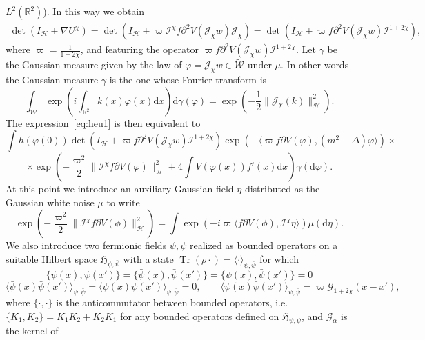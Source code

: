 \documentclass[a4paper,10pt]{article}
\newcommand{\comma}{{,}}
\newcommand{\mathd}{\mathrm{d}}
\newcommand{\tmop}[1]{\ensuremath{\operatorname{#1}}}
\begin{document}
$L^2 (\mathbb{R}^2)$). In this way we obtain
\begin{multline*}
  \det (I_{\mathcal{H}} + \nabla U^{\chi}) = \det (I_{\mathcal{H}} + \varpi
  \mathcal{I}^{\chi} f \partial^2 V (\mathcal{J}_{\chi} w) \mathcal{J}_{\chi})
  = \det (I_{\mathcal{H}} + \varpi f \partial^2 V (\mathcal{J}_{\chi} w)
  \mathcal{I}^{1 + 2 \chi}),
\end{multline*}
where $\varpi = \frac{1}{1 + 2 \chi}$, and featuring the operator $\varpi f
\partial^2 V (\mathcal{J}_{\chi} w) \mathcal{I}^{1 + 2 \chi}$. Let $\gamma$ be
the Gaussian measure given by the law of $\varphi =\mathcal{J}_{\chi} w \in
\widetilde{\mathcal{W}}$ under $\mu$. In other words the Gaussian measure
$\gamma$ is the one whose Fourier transform is
\[ \int_{\widetilde{\mathcal{W}}} \exp \left( i \int_{\mathbb{R}^2} k (x) \varphi (x) \mathd
   x \right) \mathd \gamma (\varphi) = \exp \left( - \frac{1}{2} \|
   \mathcal{J}_{\chi} (k) \|_{\mathcal{H}}^2 \right) . \]
The expression~{\eqref{eq:heu1}} is then equivalent to
\[ \int h (\varphi (0)) \det (I_{\mathcal{H}} + \varpi f \partial^2 V
   (\mathcal{J}_{\chi} w) \mathcal{I}^{1 + 2 \chi}) \exp (- \langle \varpi f
   \partial V (\varphi), (m^2 - \Delta) \varphi \rangle) \times \]
\[ \times \exp \left( - \frac{\varpi^2}{2} \|\mathcal{I}^{\chi} f \partial V
   (\varphi) \|^2_{\mathcal{H}} + 4 \int V (\varphi (x)) f' (x) \mathd x
   \right) \gamma (\mathd \varphi) . \]
At this point we introduce an auxiliary Gaussian field $\eta$ distributed as
the Gaussian white noise $\mu$ to write
\[ \exp \left( - \frac{\varpi^2}{2} \|\mathcal{I}^{\chi} f \partial V (\phi)
   \|^2_{\mathcal{H}} \right) = \int \exp (- i \varpi \langle f \partial V
   (\phi), \mathcal{I}^{\chi} \eta \rangle) \mu (\mathd \eta) . \]
We also introduce two fermionic fields $\psi, \bar{\psi}$ realized as bounded
operators on a suitable Hilbert space $\mathfrak{H}_{\psi, \bar{\psi}}$ with a
state $\tmop{Tr} (\rho \cdot) = \langle \cdot \rangle_{\psi \comma
\bar{\psi}}$ for which
\[ \{ \psi (x), \psi (x') \} = \{ \bar{\psi} (x), \bar{\psi} (x') \} = \{ \psi
   (x), \bar{\psi} (x') \} = 0 \]
\[ \langle \bar{\psi} (x) \bar{\psi} (x') \rangle_{\psi \comma \bar{\psi}} =
   \langle \psi (x) \psi (x') \rangle_{\psi \comma \bar{\psi}} = 0, \qquad
   \langle \psi (x) \bar{\psi} (x') \rangle_{\psi \comma \bar{\psi}} = \varpi
   \mathcal{G}_{1 + 2 \chi} (x - x'), \]
where $\{\cdot, \cdot\}$ is the anticommutator between bounded operators, i.e.
$\{K_1, K_2 \} = K_1 K_2 + K_2 K_1$ for any bounded operators defined on
$\mathfrak{H}_{\psi, \bar{\psi}}$, and $\mathcal{G}_{\alpha}$ is the kernel of
\end{document}
